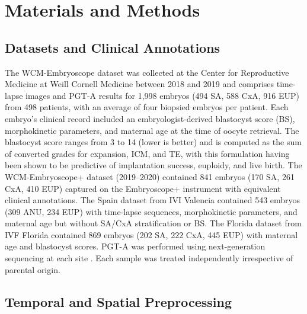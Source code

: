 \documentclass[11pt]{article}
\begin{document}
\section{Materials and Methods}

\subsection{Datasets and Clinical Annotations}

The WCM-Embryoscope dataset was collected at the Center for Reproductive Medicine at Weill Cornell Medicine between 2018 and 2019 and comprises time-lapse images and PGT-A results for 1{,}998 embryos (494 SA, 588 CxA, 916 EUP) from 498 patients, with an average of four biopsied embryos per patient. Each embryo's clinical record included an embryologist-derived blastocyst score (BS), morphokinetic parameters, and maternal age at the time of oocyte retrieval. The blastocyst score ranges from 3 to 14 (lower is better) and is computed as the sum of converted grades for expansion, ICM, and TE, with this formulation having been shown to be predictive of implantation success, euploidy, and live birth. The WCM-Embryoscope+ dataset (2019--2020) contained 841 embryos (170 SA, 261 CxA, 410 EUP) captured on the Embryoscope+ instrument with equivalent clinical annotations. The Spain dataset from IVI Valencia contained 543 embryos (309 ANU, 234 EUP) with time-lapse sequences, morphokinetic parameters, and maternal age but without SA/CxA stratification or BS. The Florida dataset from IVF Florida contained 869 embryos (202 SA, 222 CxA, 445 EUP) with maternal age and blastocyst scores. PGT-A was performed using next-generation sequencing at each site \citep{garciapascual2020ngs}. Each sample was treated independently irrespective of parental origin.

\subsection{Temporal and Spatial Preprocessing}
\end{document}
